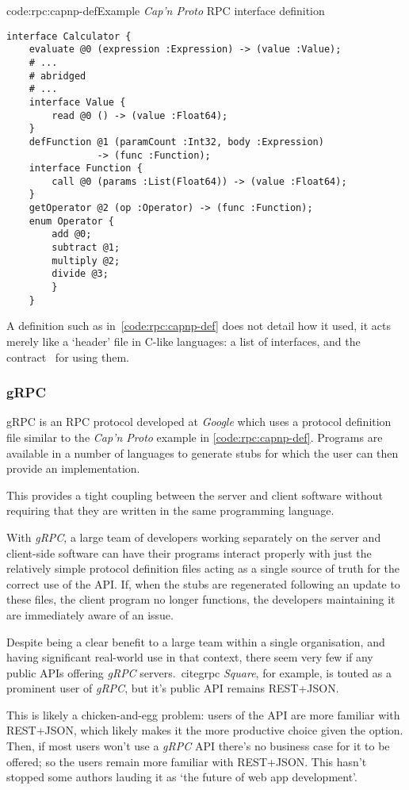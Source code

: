 \begin{codelisting}{code:rpc:capnp-def}{Example \emph{Cap'n Proto} RPC interface definition~\cite{capnp_example}}
\begin{verbatim}
interface Calculator {
    evaluate @0 (expression :Expression) -> (value :Value);
    # ...
    # abridged
    # ...
    interface Value {
        read @0 () -> (value :Float64);
    }
    defFunction @1 (paramCount :Int32, body :Expression)
                -> (func :Function);
    interface Function {
        call @0 (params :List(Float64)) -> (value :Float64);
    }
    getOperator @2 (op :Operator) -> (func :Function);
    enum Operator {
        add @0;
        subtract @1;
        multiply @2;
        divide @3;
        }
    }
\end{verbatim}
\end{codelisting}

A definition such as in~\cref{code:rpc:capnp-def} does not detail how it used, it acts merely like a `header' file in C-like languages: a list of interfaces, and the contract~ for using them.

\subsubsection{gRPC} \label{soln:rpc:grpc}

gRPC is an RPC protocol developed at \emph{Google} which uses a protocol definition file similar to the \emph{Cap'n Proto} example in \cref{code:rpc:capnp-def}. Programs are available in a number of languages to generate stubs for which the user can then provide an implementation. \cite{grpc}

This provides a tight coupling between the server and client software without requiring that they are written in the same programming language.

With \emph{gRPC}, a large team of developers working separately on the server and client-side software can have their programs interact properly with just the relatively simple protocol definition files acting as a single source of truth for the correct use of the API. If, when the stubs are regenerated following an update to these files, the client program no longer functions, the developers maintaining it are immediately aware of an issue.

Despite being a clear benefit to a large team within a single organisation, and having significant real-world use in that context, there seem very few if any public APIs offering \emph{gRPC} servers.~cite{grpc} \emph{Square}, for example, is touted as a prominent user of \emph{gRPC}, but it's public API remains REST+JSON.~\cite{square_api}

This is likely a chicken-and-egg problem: users of the API are more familiar with REST+JSON, which likely makes it the more productive  choice given the option. Then, if most users won't use a \emph{gRPC} API there's no business case for it to be offered; so the users remain more familiar with REST+JSON. This hasn't stopped some authors lauding it as `the future of web app development'.~\cite{grpc_web}